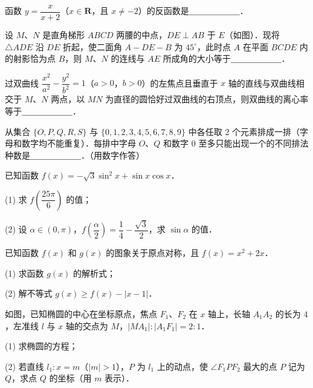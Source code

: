 \begin{question}
函数 $y = \dfrac{x}{x + 2}$（$x \in \mathbf{R}$，且 $x \neq -2$）的反函数是＿＿＿＿＿＿．

\Needspace{0.4\textheight}
\end{question}
\begin{question}
设 $M$、$N$ 是直角梯形 $ABCD$ 两腰的中点，$DE \perp AB$ 于 $E$（如图）．现将 $\triangle ADE$ 沿 $DE$ 折起，使二面角 $A - DE - B$ 为 $45^\circ$，此时点 $A$ 在平面 $BCDE$ 内的射影恰为点 $B$，则 $M$、$N$ 的连线与 $AE$ 所成角的大小等于＿＿＿＿＿＿．
\nopagebreak[4]
\begin{center}\end{center}
\nopagebreak[4]
\end{question}
\begin{question}
过双曲线 $\dfrac{x^2}{a^2} - \dfrac{y^2}{b^2} = 1$（$a > 0$，$b > 0$）的左焦点且垂直于 $x$ 轴的直线与双曲线相交于 $M$、$N$ 两点，以 $MN$ 为直径的圆恰好过双曲线的右顶点，则双曲线的离心率等于＿＿＿＿＿＿．

\end{question}
\begin{question}
从集合 $\{O, P, Q, R, S\}$ 与 $\{0, 1, 2, 3, 4, 5, 6, 7, 8, 9\}$ 中各任取 $2$ 个元素排成一排（字母和数字均不能重复）．每排中字母 $O$、$Q$ 和数字 $0$ 至多只能出现一个的不同排法种数是＿＿＿＿＿＿．（用数字作答）

\end{question}
\begin{question}
已知函数 $f(x) = -\sqrt{3}\sin^2 x + \sin x\cos x$．

(1) 求 $f\left(\dfrac{25\pi}{6}\right)$ 的值；

(2) 设 $\alpha \in (0, \pi)$，$f\left(\dfrac{\alpha}{2}\right) = \dfrac{1}{4} - \dfrac{\sqrt{3}}{2}$，求 $\sin\alpha$ 的值．

\end{question}
\begin{question}
已知函数 $f(x)$ 和 $g(x)$ 的图象关于原点对称，且 $f(x) = x^2 + 2x$．

(1) 求函数 $g(x)$ 的解析式；

(2) 解不等式 $g(x) \geqslant f(x) - |x - 1|$．

\Needspace{0.4\textheight}
\end{question}
\begin{question}
如图，已知椭圆的中心在坐标原点，焦点 $F_1$、$F_2$ 在 $x$ 轴上，长轴 $A_1A_2$ 的长为 $4$，左准线 $l$ 与 $x$ 轴的交点为 $M$，$|MA_1| : |A_1F_1| = 2:1$．

(1) 求椭圆的方程；

(2) 若直线 $l_1: x = m$（$|m| > 1$），$P$ 为 $l_1$ 上的动点，使 $\angle F_1PF_2$ 最大的点 $P$ 记为 $Q$，求点 $Q$ 的坐标（用 $m$ 表示）．
\nopagebreak[4]
\begin{center}\end{center}
\nopagebreak[4]
\Needspace{0.4\textheight}
\end{question}
